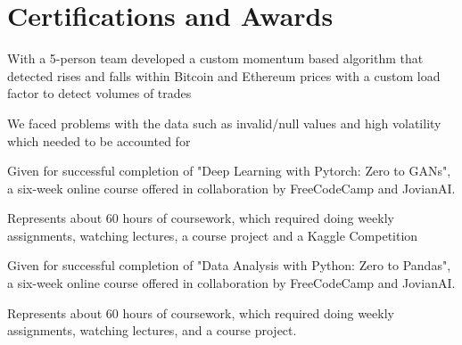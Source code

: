 \documentclass[]{resume-template}
\begin{document}
\begin{minipage}[t]{0.66\textwidth}
        \section{Certifications and Awards}\label{sec:certifications-and-awards}
        \begin{tightemize}
            \item With a  5-person team developed a custom momentum based algorithm that detected rises and falls within
            Bitcoin and Ethereum prices with a custom load factor to detect volumes of trades
            \item We faced problems with the data such as invalid/null values and high volatility which needed to be
            accounted for
        \end{tightemize}
        \sectionsep{}
        \begin{tightemize}
            \item Given for successful completion of "Deep Learning with Pytorch: Zero to GANs",
            a six-week online course offered in collaboration by FreeCodeCamp and JovianAI.
            \item Represents about 60 hours of coursework, which required doing weekly assignments, watching
            lectures, a course project and a Kaggle Competition
        \end{tightemize}
        \sectionsep{}

        \begin{tightemize}
            \item Given for successful completion of "Data Analysis with Python: Zero to Pandas",
            a six-week online course offered in collaboration by FreeCodeCamp and JovianAI.
            \item Represents about 60 hours of coursework, which required doing weekly assignments, watching lectures, and a course project.
        \end{tightemize}
        \sectionsep{}





    \end{minipage}
\end{document}

